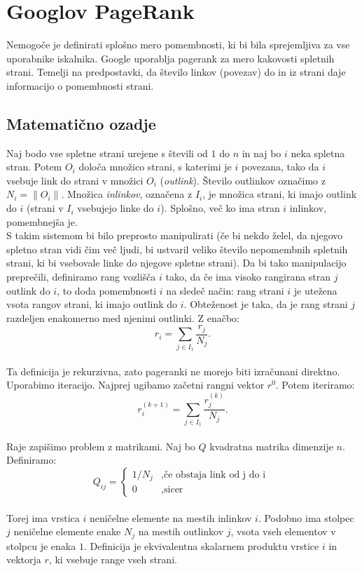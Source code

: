 \documentclass[a4paper]{article}
\begin{document}
\section{Googlov PageRank}
\hspace{4.8mm}Nemogoče je definirati splošno mero pomembnosti, ki bi bila sprejemljiva za vse uporabnike iskalnika. Google uporablja pagerank za mero kakovosti spletnih strani. Temelji na predpostavki, da število linkov (povezav) do in iz strani daje informacijo o pomembnosti strani. \\
\subsection{Matematično ozadje}
Naj bodo vse spletne strani urejene s števili od $1$ do $n$ in naj bo $i$ neka spletna stran. Potem $O_i$ določa množico strani, s katerimi je $i$ povezana, tako da $i$ vsebuje link do strani v množici $O_i$ (\textit{outlink}). Število outlinkov označimo z $N_i = \|O_i\|$. Množica \textit{inlinkov}, označena z $I_i$, je množica strani, ki imajo outlink do $i$ (strani v $I_i$ vsebujejo linke do $i$).
Splošno, več ko ima stran $i$ inlinkov, pomembnejša je. \\ S takim sistemom bi bilo preprosto manipulirati (če bi nekdo želel, da njegovo spletno stran vidi čim več ljudi, bi ustvaril veliko število nepomembnih spletnih strani, ki bi vsebovale linke do njegove spletne strani). Da bi tako manipulacijo preprečili, definiramo rang vozlišča $i$ tako, da če ima visoko rangirana stran $j$ outlink do $i$, to doda pomembnosti $i$ na sledeč način: rang strani $i$ je utežena vsota rangov strani, ki imajo outlink do $i$. Obteženost  je taka, da je rang strani $j$ razdeljen enakomerno med njenimi outlinki. Z enačbo: $$r_i = \sum_{j \in I_1} \frac{r_j}{N_j}.$$ \\
Ta definicija je rekurzivna, zato pageranki ne morejo biti izračunani direktno. Uporabimo iteracijo. Najprej ugibamo začetni rangni vektor $r^0$. Potem iteriramo:
$$r_i^{(k+1)} = \sum_{j \in I_1} \frac{r_j^{(k)}}{N_j}.$$ \\
Raje zapišimo problem z matrikami. Naj bo $Q$ kvadratna matrika dimenzije $n$. Definiramo:
\[
Q_{ij} = 
\left \{
	\begin{array}{ll}
		1/N_j  &, \mbox{če obstaja link od j do i }  \\
		0 &, \mbox{sicer} 
	\end{array}
\right. \]
\\
Torej ima vrstica $i$ neničelne elemente na mestih inlinkov $i$. Podobno ima stolpec $j$ neničelne elemente enake $N_j$ na mestih  outlinkov $j$, vsota vseh elementov v stolpcu je enaka $1$. Definicija je ekvivalentna skalarnem produktu vrstice $i$ in vektorja $r$, ki vsebuje range vseh strani.\\
\end{document}
